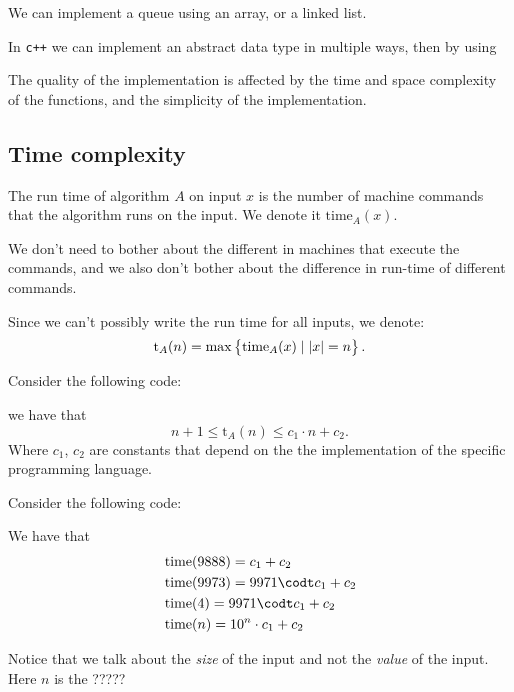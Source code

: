 \documentclass[11pt,a4paper]{article}
\begin{document}
We can implement a queue using an array, or a linked list.

In \texttt{c++} we can implement an abstract data type in multiple ways, then
by using

The quality of the implementation is affected by the time and space complexity
of the functions, and the simplicity of the implementation.

\subsection{Time complexity}

\begin{definition}
    The run time of algorithm $A$ on input $x$ is the number of machine
    commands that the algorithm runs on the input.
    We denote it $\mathrm{time}_A(x)$.
\end{definition}
\begin{remark}
    We don't need to bother about the different in machines that execute
    the commands, and we also don't bother about the difference in run-time
    of different commands.
\end{remark}

Since we can't possibly write the run time for all inputs, we denote:
\[
    \mathrm t_A(n) = \max\set{\mathrm{time}_A(x) \mid |x| = n}.
\]

\begin{example}
    Consider the following code:

    we have that
    \[
        n + 1 \le \mathrm t_A(n) \le c_1 \cdot n + c_2.
    \]
    Where $c_1$, $c_2$ are constants that depend on the the implementation
    of the specific programming language.
\end{example}

\begin{example}
    Consider the following code:

    We have that
    \begin{align*}
        &\timeop(9888) = c_1 + c_2 \\
        &\timeop(9973) = 9971 \codt c_1 + c_2 \\
        &\timeop(4) = 9971 \codt c_1 + c_2 \\
        &\timeop(n) = 10^n \cdot c_1 + c_2
    \end{align*}
\end{example}
\begin{remark}
    Notice that we talk about the \emph{size} of the input and not the 
    \emph{value} of the input.
    Here $n$ is the ?????
\end{remark}
\end{document}
